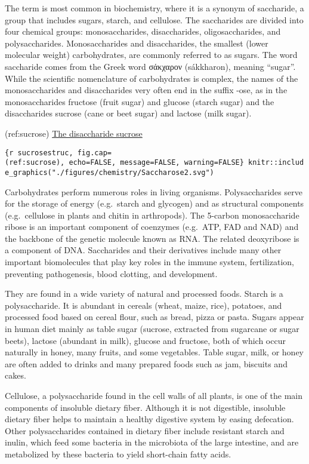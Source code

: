 The term is most common in biochemistry, where it is a synonym of
saccharide, a group that includes sugars, starch, and cellulose. The
saccharides are divided into four chemical groups: monosaccharides,
disaccharides, oligosaccharides, and polysaccharides. Monosaccharides
and disaccharides, the smallest (lower molecular weight) carbohydrates,
are commonly referred to as sugars. The word saccharide comes from the
Greek word σάκχαρον (sákkharon), meaning ``sugar''. While the scientific
nomenclature of carbohydrates is complex, the names of the
monosaccharides and disaccharides very often end in the suffix -ose, as
in the monosaccharides fructose (fruit sugar) and glucose (starch sugar)
and the disaccharides sucrose (cane or beet sugar) and lactose (milk
sugar).

(ref:sucrose)
\href{https://commons.wikimedia.org/wiki/File:Beta-D-Lactose.svg}{The
disaccharide sucrose}

\texttt{\{r\ sucrosestruc,\ fig.cap=\textquotesingle{}(ref:sucrose)\textquotesingle{},\ echo=FALSE,\ message=FALSE,\ warning=FALSE\}\ knitr::include\_graphics("./figures/chemistry/Saccharose2.svg")}

Carbohydrates perform numerous roles in living organisms.
Polysaccharides serve for the storage of energy (e.g.~starch and
glycogen) and as structural components (e.g.~cellulose in plants and
chitin in arthropods). The 5-carbon monosaccharide ribose is an
important component of coenzymes (e.g.~ATP, FAD and NAD) and the
backbone of the genetic molecule known as RNA. The related deoxyribose
is a component of DNA. Saccharides and their derivatives include many
other important biomolecules that play key roles in the immune system,
fertilization, preventing pathogenesis, blood clotting, and development.

They are found in a wide variety of natural and processed foods. Starch
is a polysaccharide. It is abundant in cereals (wheat, maize, rice),
potatoes, and processed food based on cereal flour, such as bread, pizza
or pasta. Sugars appear in human diet mainly as table sugar (sucrose,
extracted from sugarcane or sugar beets), lactose (abundant in milk),
glucose and fructose, both of which occur naturally in honey, many
fruits, and some vegetables. Table sugar, milk, or honey are often added
to drinks and many prepared foods such as jam, biscuits and cakes.

Cellulose, a polysaccharide found in the cell walls of all plants, is
one of the main components of insoluble dietary fiber. Although it is
not digestible, insoluble dietary fiber helps to maintain a healthy
digestive system by easing defecation. Other polysaccharides contained
in dietary fiber include resistant starch and inulin, which feed some
bacteria in the microbiota of the large intestine, and are metabolized
by these bacteria to yield short-chain fatty acids.

